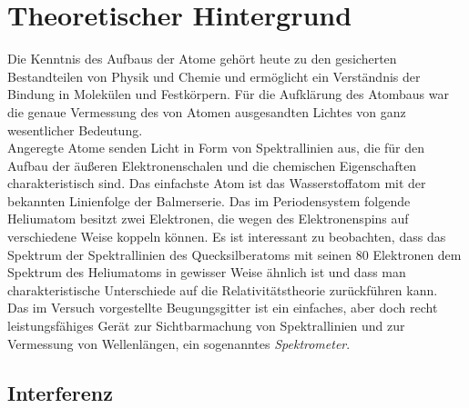 \section{Theoretischer Hintergrund}

Die Kenntnis des Aufbaus der Atome gehört heute zu den gesicherten Bestandteilen von Physik und Chemie und ermöglicht ein Verständnis der Bindung in Molekülen und Festkörpern. Für die Aufklärung des Atombaus war die genaue Vermessung des von Atomen ausgesandten Lichtes von ganz wesentlicher Bedeutung.\\
Angeregte Atome senden Licht in Form von Spektrallinien aus, die für den Aufbau der äußeren Elektronenschalen und die chemischen Eigenschaften charakteristisch sind. Das einfachste Atom ist das Wasserstoffatom mit der bekannten Linienfolge der Balmerserie. Das im Periodensystem folgende Heliumatom besitzt zwei Elektronen, die wegen des
Elektronenspins auf verschiedene Weise koppeln können. Es ist interessant zu beobachten, dass das Spektrum der Spektrallinien des Quecksilberatoms mit seinen 80 Elektronen dem Spektrum des Heliumatoms in gewisser Weise ähnlich ist und dass man charakteristische Unterschiede auf die Relativitätstheorie zurückführen kann.\\
Das im Versuch vorgestellte Beugungsgitter ist ein einfaches, aber doch recht leistungsfähiges Gerät zur Sichtbarmachung von Spektrallinien und zur Vermessung von Wellenlängen, ein sogenanntes \textit{Spektrometer}.

\subsection{Interferenz}

